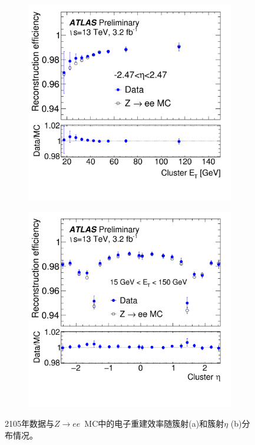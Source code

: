 \begin{figure}[h]
\begin{center}
\begin{subfigure}[b]{0.45\textwidth}
\centering
      \includegraphics[width=\textwidth]{fig/ele_reco_eff.png}
     \caption{}
      \label{fig:ele_reco_pt_eff}
  \end{subfigure}
 \begin{subfigure}[b]{0.45\textwidth}
 \centering
      \includegraphics[width=\textwidth]{fig/ele_reco_eta_eff.png}
      \caption{}
      \label{fig:ele_reco_eta_eff}
  \end{subfigure}
\caption{2105年数据与$Z\rightarrow ee$~MC中的电子重建效率随簇射\et (a)和簇射$\eta$ (b)分布情况\cite{ATLAS-CONF-2016-024}。} 
 \label{fig:ele_reco_eff}
\end{center}
\end{figure}
